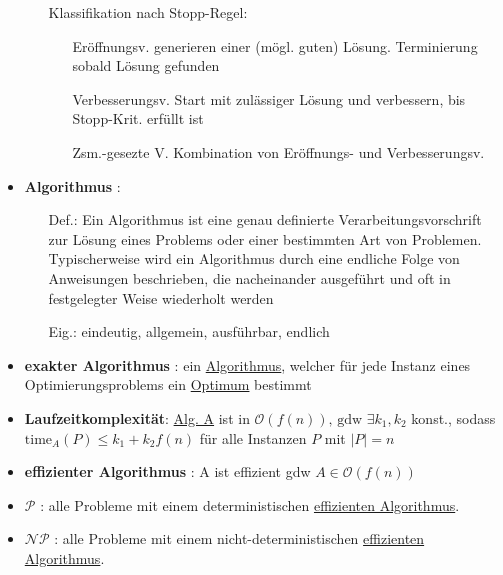 \documentclass[12pt]{article}
\begin{document}
\begin{itemize}
\begin{itemize}
					\item[Klassifikation] nach Stopp-Regel:
						\begin{enumerate}
							\item[Eröffnungsv.] generieren einer (mögl. guten) Lösung. Terminierung sobald Lösung gefunden
							\item[Verbesserungsv.] Start mit zulässiger Lösung und verbessern, bis Stopp-Krit. erfüllt ist
							\item[Zsm.-gesezte V.] Kombination von Eröffnungs- und Verbesserungsv.
						\end{enumerate} 
				\end{itemize}
			\item \textbf{Algorithmus} \label{Algorithmus}: 
				\begin{itemize}
					\item[Def.:] Ein Algorithmus ist eine genau definierte Verarbeitungsvorschrift zur Lösung eines Problems oder einer bestimmten Art von Problemen. Typischerweise wird ein Algorithmus durch eine endliche Folge von Anweisungen beschrieben, die nacheinander ausgeführt und oft in festgelegter Weise wiederholt werden
					\item[Eig.:] eindeutig, allgemein, ausführbar, endlich
				\end{itemize}
			\item \textbf{exakter Algorithmus} \label{exakter Algorithmus}: ein \hyperref[Algorithmus]{Algorithmus}, welcher für jede Instanz eines Optimierungsproblems ein \hyperref[Optimum]{Optimum} bestimmt
			\item \textbf{Laufzeitkomplexität}: \hyperref[Algorithmus]{Alg. A} ist in $\mathcal{O}(f(n)) \text{, gdw } \exists k_1,k_2$ konst., sodass $\text{time}_A(P) \le k_1+k_2 f(n)$ für alle Instanzen $P$ mit $|P|=n$
			\item \textbf{effizienter Algorithmus} \label{effizienter Algorithmus}: A ist effizient gdw $A \in \mathcal{O}(f(n))$
			\item \textbf{$\mathcal{P}$} \label{P}: alle Probleme mit einem deterministischen \hyperref[effizienter Algorithmus]{effizienten Algorithmus}.
			\item \textbf{$\mathcal{NP}$} \label{NP}: alle Probleme mit einem nicht-deterministischen \hyperref[effizienter Algorithmus]{effizienten Algorithmus}.

\end{itemize}
\end{document}
